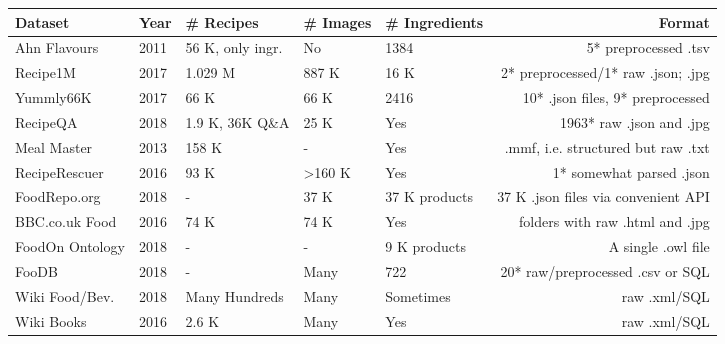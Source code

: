 \begin{tabular}{lllllr}
\toprule
 Dataset              & Year & \# Recipes       & \# Images      & \# Ingredients    & Format                                \\
\midrule
Ahn Flavours          & 2011 & 56 K, only ingr. & No             & 1384           & 5* preprocessed .tsv                  \\
Recipe1M              & 2017 & 1.029 M          & 887 K          & 16 K           & 2* preprocessed/1* raw .json; .jpg    \\
Yummly66K             & 2017 & 66 K             & 66 K           & 2416           & 10* .json files, 9* preprocessed      \\
RecipeQA              & 2018 & 1.9 K, 36K Q\&A  & 25 K           & Yes            & 1963* raw .json and .jpg              \\
Meal Master           & 2013 & 158 K            & -              & Yes            & .mmf, i.e. structured but raw .txt    \\
RecipeRescuer         & 2016 & 93 K             & >160 K         & Yes            & 1* somewhat parsed .json              \\
FoodRepo.org          & 2018 & -                & 37 K           & 37 K products  & 37 K .json files via convenient API   \\
BBC.co.uk Food        & 2016 & 74 K             & 74 K           & Yes            & folders with raw .html and .jpg       \\
FoodOn Ontology       & 2018 & -                & -              & 9 K products   & A single .owl file                    \\
FooDB                 & 2018 & -                & Many           & 722            & 20* raw/preprocessed .csv or SQL      \\
Wiki Food/Bev.        & 2018 & Many Hundreds    & Many           & Sometimes      & raw .xml/SQL                          \\
Wiki Books            & 2016 & 2.6 K            & Many           & Yes            & raw .xml/SQL                          \\
\bottomrule
\end{tabular}
